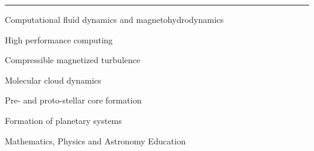 
\rule[3pt]{336.9pt}{.1mm}


\bigskip

\medskip
\noindent Computational fluid dynamics and magnetohydrodynamics 

\medskip
\noindent High performance computing

\medskip
\noindent Compressible magnetized turbulence

\medskip
\noindent Molecular cloud dynamics

\medskip
\noindent Pre- and proto-stellar core formation

\medskip
\noindent Formation of planetary systems

\medskip
\noindent Mathematics, Physics and Astronomy Education

\bigskip
\bigskip
